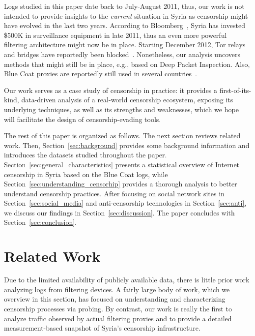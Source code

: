 \documentclass{sig-alternate-2013}
\newcommand{\descr}[1]{\smallskip\noindent{\bf #1}}
\begin{document}
\descr{Remarks.} Logs studied in this paper date back to July-August 2011, thus, our work is not intended to provide insights to the {\em current} situation in Syria as censorship might have evolved in the last two years. According to Bloomberg~\cite{bloomberg}, Syria has invested \$500K in surveillance equipment in late 2011, thus an even more powerful filtering architecture might now be in place. Starting December 2012, Tor relays and bridges have reportedly been blocked~\cite{tor-syria}.
Nonetheless, our analysis uncovers methods that might still be in place, e.g., based on Deep Packet Inspection. Also, Blue Coat proxies are reportedly still used in several countries~\cite{citizenlab}. 

Our work serves as a case study of censorship in practice: it provides a first-of-its-kind, data-driven analysis of a real-world censorship ecosystem, exposing its underlying techniques, as well as its strengths and weaknesses, which we hope will facilitate the design of censorship-evading tools.


\descr{Paper Organization.} The rest of this paper is organized as follows. The next section reviews related work. Then, Section~\ref{sec:background} provides some background information and introduces the datasets studied throughout the paper.
Section~\ref{sec:general_characteristics} presents a statistical overview of Internet censorship in Syria based on the Blue Coat logs, while Section~\ref{sec:understanding_censorhip} provides a thorough analysis to better understand censorship practices. After focusing on social network sites in Section~\ref{sec:social_media} and anti-censorship technologies in Section~\ref{sec:anti}, we discuss our findings in Section~\ref{sec:discussion}. 
The paper concludes with Section~\ref{sec:conclusion}.





\section{Related Work}\label{sec:related}
Due to the limited availability of publicly available data, there is little prior work analyzing logs from filtering devices. A fairly large body of work, which we overview in this section, has focused on understanding and characterizing censorship processes via probing. By contrast, our work is really the first to analyze traffic observed by actual filtering proxies and to provide a detailed measurement-based snapshot of Syria's censorship infrastructure.
\end{document}
